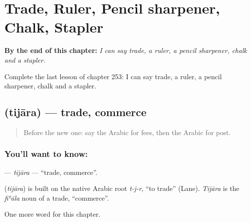 
\chapter{Trade, Ruler, Pencil sharpener, Chalk, Stapler}
\label{ch:ar-trade-ruler-pencil-sharpener-chalk-stapler}

\begin{chapteropening}
\textbf{By the end of this chapter:} \emph{I can say trade, a ruler, a pencil sharpener, chalk and a stapler.}

Complete the last lesson of chapter 253: I can say trade, a ruler, a pencil sharpener, chalk and a stapler.
\end{chapteropening}

\section[\texorpdfstring{\ar{تجارة} (tijāra)}{تجارة (tijāra)}]{ (tijāra) — trade, commerce}

\label{lesson:AR-C253-tijara}



\begin{quote}
Before the new one: say the Arabic for fees, then the Arabic for post.
\end{quote}

\subsection*{You'll want to know: }
\textbf{} — \emph{tijāra} — \textquotedblleft{}trade, commerce\textquotedblright{}.

\begin{cousinweb}
\textbf{} (\emph{tijāra}) is built on the native Arabic root \emph{t-j-r}, \textquotedblleft{}to trade\textquotedblright{} (Lane). \emph{Tijāra} is the \emph{fiʿāla} noun of a trade, \textquotedblleft{}commerce\textquotedblright{}.
\end{cousinweb}

\begin{grammarlens}[title={What you've built}]
One more word for this chapter.
\end{grammarlens}

